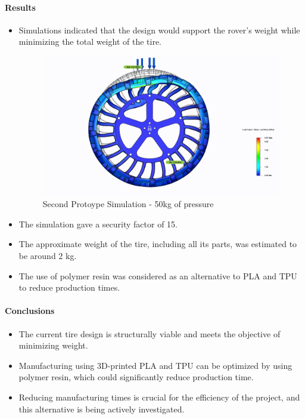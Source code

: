 \documentclass{article}
\begin{document}
\paragraph[short]{Results}
\begin{itemize}
    \item Simulations indicated that the design would support the rover's weight while minimizing the total weight of the tire. 
    \begin{figure}[H]
        \centering
        \includegraphics[width=\linewidth]{Images/Wheels/SimP2-10.png}
        \caption{Second Protoype Simulation - 50kg of pressure}
    \end{figure}
    \item The simulation gave a security factor of 15.
    \item The approximate weight of the tire, including all its parts, was estimated to be around 2 kg.
    \item The use of polymer resin was considered as an alternative to PLA and TPU to reduce production times.
\end{itemize}

\paragraph[short]{Conclusions}
\begin{itemize}
    \item The current tire design is structurally viable and meets the objective of minimizing weight.
    \item Manufacturing using 3D-printed PLA and TPU can be optimized by using polymer resin, which could significantly reduce production time.
    \item Reducing manufacturing times is crucial for the efficiency of the project, and this alternative is being actively investigated.
\end{itemize}
\end{document}
